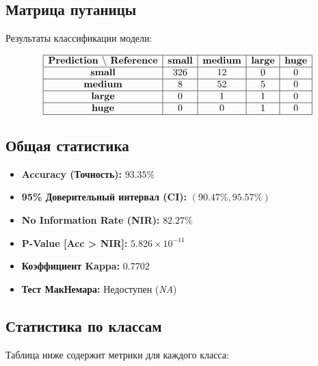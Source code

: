 \subsection*{Матрица путаницы}

Результаты классификации модели:

\[
\begin{array}{|c|c|c|c|c|}
	\hline
	\textbf{Prediction $\backslash$ Reference} & \textbf{small} & \textbf{medium} & \textbf{large} & \textbf{huge} \\
	\hline
	\textbf{small} & 326 & 12 & 0 & 0 \\
	\hline
	\textbf{medium} & 8 & 52 & 5 & 0 \\
	\hline
	\textbf{large} & 0 & 1 & 1 & 0 \\
	\hline
	\textbf{huge} & 0 & 0 & 1 & 0 \\
	\hline
\end{array}
\]

\subsection*{Общая статистика}

\begin{itemize}
	\item \textbf{Accuracy (Точность):} \( 93.35\% \)
	\item \textbf{95\% Доверительный интервал (CI):} \( (90.47\%, 95.57\%) \)
	\item \textbf{No Information Rate (NIR):} \( 82.27\% \)
	\item \textbf{P-Value [Acc > NIR]:} \( 5.826 \times 10^{-11} \)
	\item \textbf{Коэффициент Kappa:} \( 0.7702 \)
	\item \textbf{Тест МакНемара:} Недоступен (\textit{NA})
\end{itemize}

\subsection*{Статистика по классам}

Таблица ниже содержит метрики для каждого класса:

